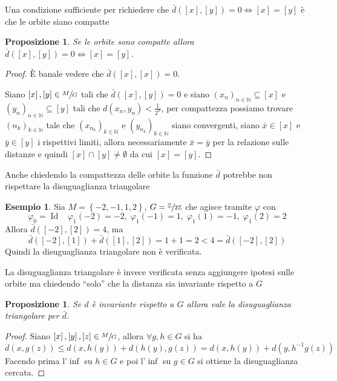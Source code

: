 \documentclass[a4paper,10pt]{article}
\newcounter{counter1}
\theoremstyle{plain}
\newtheorem{mypro}[counter1]{Proposizione}
\theoremstyle{definition}
\newtheorem{myes}[counter1]{Esempio}
\theoremstyle{remark}
\newcommand{\set}[1]{\left\{#1\right\}}
\newcommand{\pa}[1]{\left(#1\right)}
\newcommand{\bra}[1]{\left[#1\right]}
\DeclareMathOperator{\id}{Id}
\begin{document}
Una condizione sufficiente per richiedere che $\bar d (\bra{x} , \bra
{y} ) = 0 \Leftrightarrow \bra{x} = \bra{y}$ è che le orbite siano
compatte
\begin{mypro}
  Se le orbite sono compatte allora $\bar d (\bra{x},\bra{y}) = 0
  \Leftrightarrow \bra{x} = \bra{y}$.
\end{mypro}
\begin{proof}
  \`E banale vedere che $\bar d (\bra{x}, \bra{x} ) = 0$.

  Siano $\bra{x}, \bra{y} \in \sfrac{M}{G}$ tali che $\bar d
  (\bra{x},\bra{y}) = 0$ e siano $\pa{x_n}_ {n\in \mathbb{N}}
  \subseteq \bra{x}$ e $\pa{y_n}_ {n\in \mathbb{N}} \subseteq \bra{y}$
  tali che $d(x_n,y_n) < \frac{1}{2^n}$, per compattezza possiamo
  trovare $\pa{n_k} _{k\in \mathbb{N}}$ tale che $\pa{x_{n_k}}_{k\in
    \mathbb{N}}$ e $\pa{y_{n_k}}_{k\in \mathbb{N}}$ siano convergenti,
  siano $\bar x \in \bra{x}$ e $\bar y\in \bra{y}$ i rispettivi
  limiti, allora necessariamente $\bar x = \bar y$ per la relazione
  sulle distanze e quindi $\bra{x} \cap \bra{y} \neq \emptyset$ da cui
  $\bra{x} = \bra{y}$.
\end{proof}

Anche chiedendo la compattezza delle orbite la funzione $\bar d$
potrebbe non rispettare la disuguaglianza triangolare
\begin{myes}
  Sia $M = \set{ -2 , -1, 1, 2}$, $G =
  \sfrac{\mathbb{Z}}{2\mathbb{Z}}$ che agisce tramite $\varphi$ con
  \[ \varphi _0 = \id \;\;\; \varphi _1 (-2) = -2 ,\; \varphi _1 (-1)
  = 1 ,\; \varphi _1 (1) = -1 ,\; \varphi _1 (2) = 2 \]
  Allora $\bar d ( \bra{-2}, \bra{2}) = 4$, ma
  \[ \bar d (\bra{-2} , \bra{1} ) + \bar d (\bra{1} , \bra{2} ) = 1 + 1
  = 2 < 4 = \bar d ( \bra{-2}, \bra{2}) \]
  Quindi la disuguaglianza triangolare non è verificata.
\end{myes}

La disuguaglianza triangolare è invece verificata senza aggiungere
ipotesi sulle orbite ma chiedendo ``solo'' che la distanza sia
invariante rispetto a $G$
\begin{mypro}
  Se $d$ è invariante rispetto a $G$ allora vale la disuguaglianza
  triangolare per $\bar d$.
\end{mypro}
\begin{proof}
  Siano $\bra{x}, \bra{y}, \bra{z} \in \sfrac{M}{G}$, allora $\forall
  g,h \in G$ si ha
  \[ d(x,g(z)) \le d(x,h(y)) + d(h(y),g(z)) = d(x,h(y)) +
  d(y,h^{-1}g(z)) \]
  Facendo prima l'$\inf$ su $h\in G$ e poi l'$\inf$ su $g \in G$ si
  ottiene la disuguaglianza cercata.
\end{proof}
\end{document}
